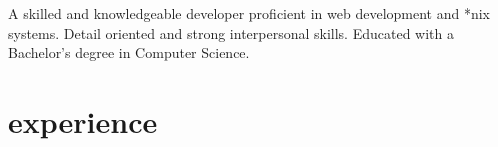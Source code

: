 \documentclass[]{cv-style} %
\begin{document}
A skilled and knowledgeable developer proficient in web development and *nix systems. Detail oriented and strong interpersonal skills. Educated with a Bachelor's degree in Computer Science.


\section{experience}

%
%
%
%
\end{document}
